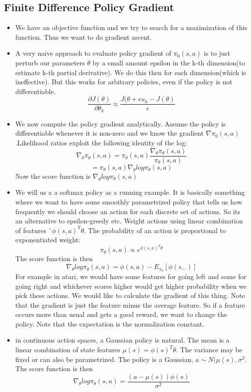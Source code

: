 \documentclass[a4paper]{article}
\begin{document}
\subsection{Finite Difference Policy Gradient}
\begin{itemize}
    \item We have an objective function and we try to search for a maximization of this function. Thus we want to do gradient ascent. 
    \item A very naive approach to evaluate policy gradient of $\pi_0(s,a)$ is to just perturb our parameters $\theta$ by a small amount epsilon in the k-th dimension(to estimate k-th partial derivative). We do this then for each dimension(which is ineffective). But this works for arbitrary policies, even if the policy is not differentiable.
    $$\frac{\partial J(\theta)}{\partial \theta_k} \approx \frac{J(\theta + \epsilon u_k - J(\theta)}{\epsilon}$$
    \item We now compute the policy gradient analytically. Assume the policy is differentiable whenever it is non-zero and we know the gradient $\nabla \pi_0(s,a)$.Likelihood ratios exploit the following identity of the log: $$\nabla_{\theta} \pi_{\theta}(s,a) = \pi_{\theta}(s,a) \frac{\nabla_{\theta} \pi_{\theta}(s,a)}{\pi_{\theta}(s,a)}$$ 
    $$ = \pi_{\theta}(s,a) \nabla_{\theta} log \pi_{\theta}(s,a)$$
    Now the score function is $\nabla_{\theta}log \pi_{\theta}(s,a)$
    \item We will us a a softmax policy as a running example. It is basically something where we want to have some smoothly parametrized policy that tells us how frequently we should choose an action for each discrete set of actions. So its an alternative to epsilon-greedy etc. Weight actions using linear combination of features ¨$\phi(s,a)^T\theta$. The probability of an action is proportional to exponentiated weight:$$ \pi_{\theta}(s,a) \propto e^{\phi(s,a)^T\theta}$$
    The score function is then $$\nabla_{\theta}log \pi_{\theta}(s,a) = \phi(s,a) - E_{\pi_{\theta}}[\phi(s,.)]$$
    For example in atari, we would have some features for going left and some for going right and whichever scores higher would get higher probability when we pick these actions. We would like to calculate the gradient of this thing. Note that the gradient is just the feature minus the average feature. So if a feature occurs more than usual and gets a good reward, we want to change the policy. Note that the expectation is the normalization constant. 
    \item in continuous action spaces, a Gaussian policy is natural. The mean is a linear combination of state features $ \mu(s) = \phi(s)^T\theta$. The variance may be fixed or can also be parametrized. The policy is a Gaussian, $a\sim N(\mu(s),\sigma^2$. The score function is then $$\nabla_{\theta}log \pi_{\theta}(s,a) = \frac{(a-\mu(s))\phi(s)}{\sigma^2}$$

\end{itemize}
\end{document}

